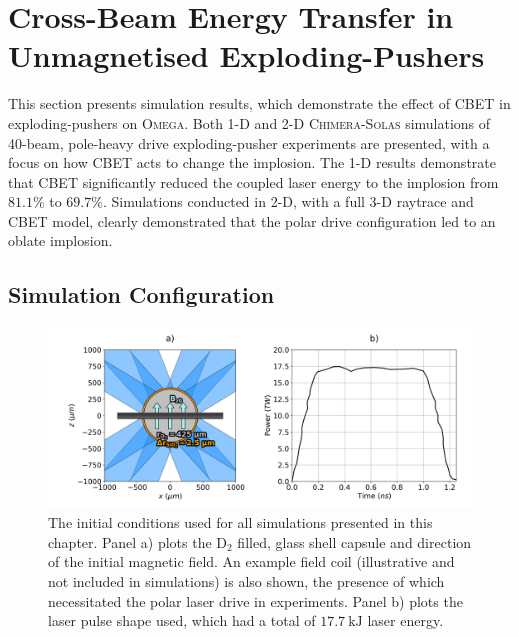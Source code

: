 \section{Cross-Beam Energy Transfer in Unmagnetised Exploding-Pushers}%
\label{sec:Res2_CBET_expl}

This section presents simulation results, which demonstrate the effect of \ac{CBET} in exploding-pushers on \textsc{Omega}.
Both 1-D and 2-D \textsc{Chimera}-\textsc{Solas} simulations of 40-beam, pole-heavy drive exploding-pusher experiments are presented, with a focus on how \ac{CBET} acts to change the implosion.
The 1-D results demonstrate that \ac{CBET} significantly reduced the coupled laser energy to the implosion from $81.1\%$ to $69.7\%$.
Simulations conducted in 2-D, with a full 3-D raytrace and \ac{CBET} model, clearly demonstrated that the polar drive configuration led to an oblate implosion. 

\subsection{Simulation Configuration}%
\label{sec:Res2_simconfig}

\begin{figure}[t!]
    \includegraphics[width=\linewidth]{Results2/Images/magpdd_diagram_pulse.png}
    \centering
    \caption{The initial conditions used for all simulations presented in this chapter.
    Panel a) plots the D${}_{2}$ filled, glass shell capsule and direction of the initial magnetic field.
    An example field coil (illustrative and not included in simulations) is also shown, the presence of which necessitated the polar laser drive in experiments.
    Panel b) plots the laser pulse shape used, which had a total of $17.7\ \text{kJ}$ laser energy.}%
    \label{fig:Res2_simconfig}
\end{figure}

